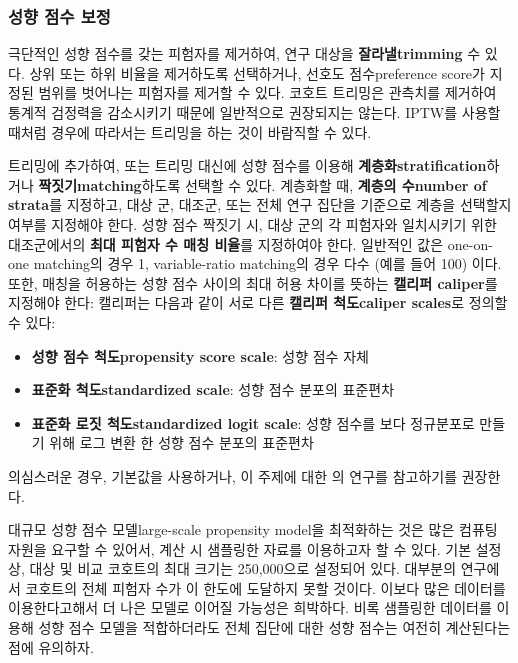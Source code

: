 \documentclass[10.5pt]{book}
\providecommand{\tightlist}{%
  \setlength{\itemsep}{0pt}\setlength{\parskip}{0pt}}
\theoremstyle{definition}
\theoremstyle{definition}
\theoremstyle{definition}
\theoremstyle{remark}
\begin{document}
\subsubsection*{성향 점수 보정}\label{--}

극단적인 성향 점수를 갖는 피험자를 제거하여, 연구 대상을
\textbf{잘라낼trimming} 수 있다. 상위 또는 하위 비율을 제거하도록
선택하거나, 선호도 점수preference score가 지정된 범위를 벗어나는
피험자를 제거할 수 있다. 코호트 트리밍은 관측치를 제거하여 통계적
검정력을 감소시키기 때문에 일반적으로 권장되지는 않는다. IPTW를 사용할
때처럼 경우에 따라서는 트리밍을 하는 것이 바람직할 수 있다.

트리밍에 추가하여, 또는 트리밍 대신에 성향 점수를 이용해
\textbf{계층화stratification}하거나 \textbf{짝짓기matching}하도록 선택할
수 있다. 계층화할 때, \textbf{계층의 수number of strata}를 지정하고,
대상 군, 대조군, 또는 전체 연구 집단을 기준으로 계층을 선택할지 여부를
지정해야 한다. 성향 점수 짝짓기 시, 대상 군의 각 피험자와 일치시키기
위한 대조군에서의 \textbf{최대 피험자 수 매칭 비율}를 지정하여야 한다.
일반적인 값은 one-on-one matching의 경우 1, variable-ratio matching의
경우 다수 (예를 들어 100) 이다. 또한, 매칭을 허용하는 성향 점수 사이의
최대 허용 차이를 뜻하는 \textbf{캘리퍼 caliper}를 지정해야 한다:
캘리퍼는 다음과 같이 서로 다른 \textbf{캘리퍼 척도caliper scales}로
정의할 수 있다: 

\begin{itemize}
\tightlist
\item
  \textbf{성향 점수 척도propensity score scale}: 성향 점수 자체
\item
  \textbf{표준화 척도standardized scale}: 성향 점수 분포의 표준편차
\item
  \textbf{표준화 로짓 척도standardized logit scale}: 성향 점수를 보다
  정규분포로 만들기 위해 로그 변환 한 성향 점수 분포의 표준편차
\end{itemize}

의심스러운 경우, 기본값을 사용하거나, 이 주제에 대한 \citet{austin_2011}
의 연구를 참고하기를 권장한다.

대규모 성향 점수 모델large-scale propensity model을 최적화하는 것은 많은
컴퓨팅 자원을 요구할 수 있어서, 계산 시 샘플링한 자료를 이용하고자 할 수
있다. 기본 설정 상, 대상 및 비교 코호트의 최대 크기는 250,000으로
설정되어 있다. 대부분의 연구에서 코호트의 전체 피험자 수가 이 한도에
도달하지 못할 것이다. 이보다 많은 데이터를 이용한다고해서 더 나은 모델로
이어질 가능성은 희박하다. 비록 샘플링한 데이터를 이용해 성향 점수 모델을
적합하더라도 전체 집단에 대한 성향 점수는 여전히 계산된다는 점에
유의하자.
\end{document}
